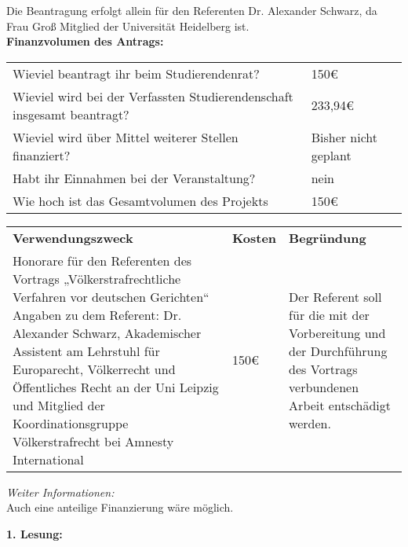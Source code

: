 {    Die Beantragung erfolgt allein für den Referenten Dr. Alexander Schwarz, da Frau Groß Mitglied der Universität Heidelberg ist.\\[1em]
    \textbf{Finanzvolumen des Antrags:}\\
    \begin{tabular}{l l}
        Wieviel beantragt ihr beim Studierendenrat?                             & 150€       \\
        Wieviel wird bei der Verfassten Studierendenschaft insgesamt beantragt? & 233,94€    \\
        Wieviel wird über Mittel weiterer Stellen finanziert?                   & Bisher nicht geplant      \\
        Habt ihr Einnahmen bei der Veranstaltung?                               & nein \\
        Wie hoch ist das Gesamtvolumen des Projekts                             & 150€\\
    \end{tabular}
    \newline
    \vspace*{2em}
    \newline
    \begin{tabular}{p{8cm} p{2cm} p{5cm}}
        \textbf{Verwendungszweck} & \textbf{Kosten} & \textbf{Begründung} \\
        Honorare für den Referenten des Vortrags „Völkerstrafrechtliche Verfahren vor deutschen Gerichten“
        \newline Angaben zu dem Referent:\newline
        Dr. Alexander Schwarz, Akademischer Assistent am Lehrstuhl für Europarecht, Völkerrecht und Öffentliches Recht an der Uni Leipzig und Mitglied der Koordinationsgruppe Völkerstrafrecht bei Amnesty International
        & 150€ & Der Referent soll für die mit der Vorbereitung und der Durchführung des Vortrags verbundenen Arbeit entschädigt werden.\\  
    \end{tabular}
    \emph{Weiter Informationen:}\\
    Auch eine anteilige Finanzierung wäre möglich.
}{
    \textbf{1. Lesung:}
    \ul{}
}
